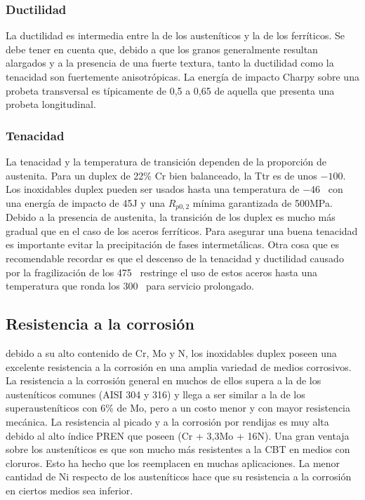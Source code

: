 \subsubsection{Ductilidad}

La ductilidad es intermedia entre la de los austeníticos y la de los ferríticos. Se debe tener en cuenta que, debido a que los granos generalmente resultan alargados y a la presencia de una fuerte textura, tanto la ductilidad como la tenacidad son fuertemente anisotrópicas. La energía de impacto Charpy sobre una probeta transversal es típicamente de 0,5 a 0,65 de aquella que presenta una probeta longitudinal.

\subsubsection{Tenacidad}

La tenacidad y la temperatura de transición dependen de la proporción de austenita. Para un duplex de 22\% Cr bien balanceado, la Ttr es de unos $-100$\grad. Los inoxidables duplex pueden ser usados hasta una temperatura de $-46$\grad~ con una energía de impacto de 45J y una $R_{p0,2}$ mínima garantizada de 500MPa. Debido a la presencia de austenita, la transición de los duplex es mucho más gradual que en el caso de los aceros ferríticos. Para asegurar una buena tenacidad es importante evitar la precipitación de fases intermetálicas. Otra cosa que es recomendable recordar es que el descenso de la tenacidad y ductilidad causado por la fragilización de los 475\grad~ restringe el uso de estos aceros hasta una temperatura que ronda los 300\grad~ para servicio prolongado.

\subsection{Resistencia a la corrosión}

debido a su alto contenido de Cr, Mo y N, los inoxidables duplex poseen una excelente resistencia a la corrosión en una amplia variedad de medios corrosivos. La resistencia a la corrosión general en muchos de ellos supera a la de los austeníticos comunes (AISI 304 y 316) y llega a ser similar a la de los superausteníticos con 6\% de Mo, pero a un costo menor y con mayor resistencia mecánica. La resistencia al picado y a la corrosión por rendijas es muy alta debido al alto índice PREN que poseen (Cr + 3,3Mo + 16N). Una gran ventaja sobre los austeníticos es que son mucho más resistentes a la CBT en medios con cloruros. Esto ha hecho que los reemplacen en muchas aplicaciones. La menor cantidad de Ni respecto de los austeníticos hace que su resistencia a la corrosión en ciertos medios sea inferior.

